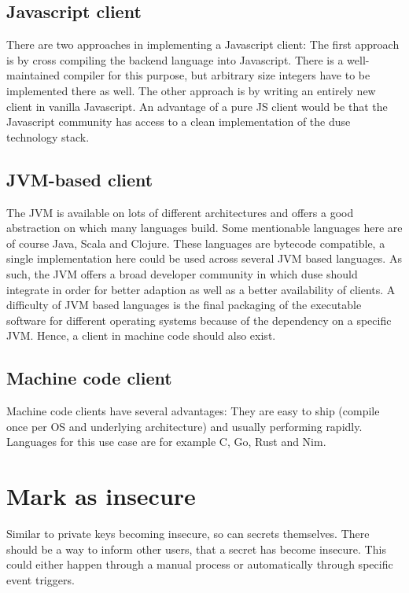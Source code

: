 \subsection{Javascript client}

There are two approaches in implementing a Javascript client: The first
approach is by cross compiling the backend language into Javascript. There
is a well-maintained compiler for this purpose, but arbitrary size integers
have to be implemented there as well. The other approach is by writing
an entirely new client in vanilla Javascript. An advantage of a pure JS
client would be that the Javascript community has access to a clean
implementation of the duse technology stack.

\subsection{JVM-based client}

The JVM is available on lots of different architectures and offers a good 
abstraction on which many languages build. Some mentionable languages here are
of course Java, Scala and Clojure. These languages are bytecode compatible,
a single implementation here could be used across several JVM based languages.
As such, the JVM offers a broad developer community in which duse should
integrate in order for better adaption as well as a better availability of
clients. A difficulty of JVM based languages is the final packaging of the
executable software for different operating systems because of the dependency
on a specific JVM. Hence, a client in machine code should also exist.

\subsection{Machine code client}

Machine code clients have several advantages: They are easy to ship (compile
once per OS and underlying architecture) and usually performing rapidly.
Languages for this use case are for example C, Go, Rust and Nim.

\section{Mark as insecure}

Similar to private keys becoming insecure, so can secrets themselves. There
should be a way to inform other users, that a secret has become insecure. This
could either happen through a manual process or automatically through specific
event triggers.

